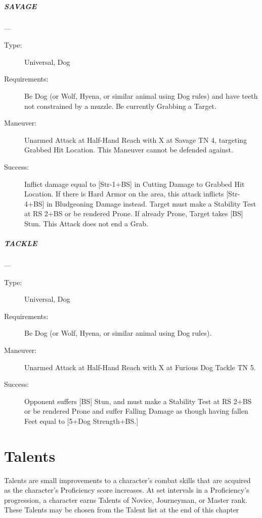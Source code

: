 \documentclass[oneside,11pt,english]{book}
\begin{document}
\paragraph{\large\label{man:SAVAGE} SAVAGE}---\quad{\large[X]}
\vspace{-10pt}\begin{description} 
\item [Type:] Universal, Dog 
\item [Requirements:] Be Dog (or Wolf, Hyena, or similar animal using Dog rules) and have teeth not 
constrained by a muzzle. Be currently Grabbing a Target. 
\item [Maneuver:] Unarmed Attack at Half-Hand Reach with X at Savage TN 4, targeting Grabbed Hit 
Location. This Maneuver cannot be defended against. 
\item [Success:] Inflict damage equal to [Str-1+BS] in Cutting Damage to Grabbed Hit Location. If there is Hard 
Armor on the area, this attack inflicts [Str-4+BS] in Bludgeoning Damage instead. Target must make a 
Stability Test at RS 2+BS or be rendered Prone. If already Prone, Target takes [BS] Stun. 
This Attack does not end a Grab. 
\end{description}
\paragraph{\large\label{man:TACKLE} TACKLE}---\quad{\large[2+X]}
\vspace{-10pt}\begin{description} 
\item [Type:] Universal, Dog 
\item [Requirements:] Be Dog (or Wolf, Hyena, or similar animal using Dog rules). 
\item [Maneuver:] Unarmed Attack at Half-Hand Reach with X at Furious Dog Tackle TN 5. 
\item [Success:] Opponent suffers [BS] Stun, and must make a Stability Test at RS 2+BS or be rendered Prone 
and suffer Falling Damage as though having fallen Feet equal to [5+Dog Strength+BS.] 
\end{description}

\chapter{Talents}\label{ch:Talents} %
\startcontents[chapters]
\clearpage
Talents are small improvements to a character’s combat skills that are acquired as the character’s Proficiency score increases. At set intervals in a Proficiency’s progression, a character earns Talents of Novice, Journeyman, or Master rank. These Talents may be chosen from the Talent list at the end of this chapter
\end{document}
